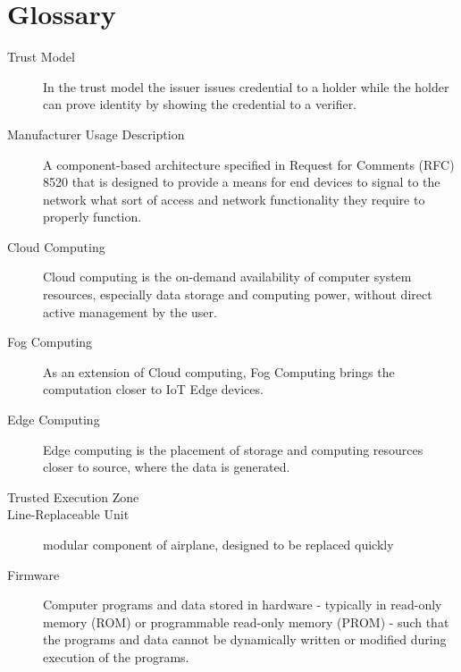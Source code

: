 \chapter*{Glossary}


\begin{description}
	\item[Trust Model] In the trust model the issuer issues credential to a holder while the holder can prove identity by
		showing the credential to a verifier.
	\item [Manufacturer Usage Description] A component-based architecture specified in Request for Comments (RFC)
	      8520 that is designed to provide a means for end devices to signal to the network what sort of access and
	      network functionality they require to properly function.
	\item [Cloud Computing] Cloud computing is the on-demand availability of computer system resources, especially
	      data storage and computing power, without direct active management by the user.
	\item [Fog Computing] As an extension of Cloud computing, Fog Computing brings the computation closer to IoT
	      Edge devices.
	\item [Edge Computing] Edge computing is the placement of storage and computing resources closer to source, where
	      the data is generated.
	\item [Trusted Execution Zone]
	\item [Line-Replaceable Unit] modular component of airplane, designed to be replaced quickly
	\item [Firmware] Computer programs and data stored in hardware - typically in read-only memory (ROM) or
	      programmable read-only memory (PROM) - such that the programs and data cannot be dynamically written
	      or modified during execution of the programs.
\end{description}
